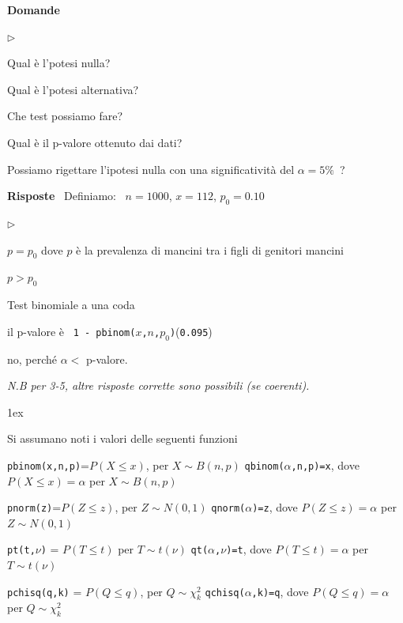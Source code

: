 \documentclass[12pt,openany]{book}
\newcommand{\mylabel}[1]{{\footnotesize\textsf{#1}}\hfill}
\renewenvironment{itemize}
  {\begin{list}{$\triangleright$}{%
   \setlength{\parskip}{0mm}
   \setlength{\topsep}{.2\baselineskip}
   \setlength{\rightmargin}{0mm}
   \setlength{\listparindent}{0mm}
   \setlength{\itemindent}{0mm}
   \setlength{\labelwidth}{3ex}
   \setlength{\itemsep}{.4\baselineskip}
   \setlength{\parsep}{0mm}
   \setlength{\partopsep}{0mm}
   \setlength{\labelsep}{1ex}
   \setlength{\leftmargin}{\labelwidth+\labelsep}
   \let\makelabel\mylabel}}{%
   \end{list}\vspace*{-1.3mm}}
\theoremstyle{mio}
\theoremstyle{liscio}
\begin{document}
\textbf{Domande}

\begin{itemize}
\item[1.] Qual è l'potesi nulla?

\item[2.] Qual è l'potesi alternativa?

\item[3.] Che test possiamo fare?

\item[4.] Qual è il p-valore ottenuto dai dati?

\item[5.] Possiamo rigettare l'ipotesi nulla con una significatività del $\alpha=5\%$~?
\end{itemize}

\textbf{Risposte} \ Definiamo: \ $n=1000$,\hfil
$x=112$,\hfil
$p_0=0.10$\hfil

\begin{itemize}
\item[1.] $p=p_0$ dove $p$ è la prevalenza di mancini tra i figli di genitori mancini
\item[2.]  $p>p_0$ 
\item[3.] Test binomiale a una coda
\item[4.] il p-valore è \ {\tt 1 - pbinom($x$,$n$,$p_0$)}\hfill ({\tt 0.095})
\item[5.] no, perché $\alpha<$ p-valore.
\end{itemize}


\textit{N.B per 3-5, altre risposte corrette sono possibili (se coerenti).}

\parskip1ex
{\hrulefill\scriptsize

Si assumano noti i valori delle seguenti funzioni

{\tt pbinom(x,n,p)}=$P(X\le x)$, per $X\sim B(n,p)$
\hfill 
{\tt qbinom($\alpha$,n,p)=x},  dove $P(X\le x)=\alpha$ per $X\sim B(n,p)$

{\tt pnorm(z)}=$P(Z\le z)$, per $Z\sim N(0,1)$
\hfill 
{\tt qnorm($\alpha$)=z},  dove $P(Z\le z)=\alpha$ per $Z\sim N(0,1)$

{\tt pt(t,$\nu$)} = $P(T\le t)$ per $T\sim t(\nu)$
\hfill
{\tt qt($\alpha$,$\nu$)=t}, dove $P(T\le t)=\alpha$ per $T\sim t(\nu)$

{\tt pchisq(q,k)} = $P(Q\le q)$, per $Q\sim \chi^2_k$
\hfill
{\tt qchisq($\alpha$,k)=q},  dove $P(Q\le q)=\alpha$ per $Q\sim \chi^2_k$
\par
}


\hfill{}\clearpage\
\end{document}
